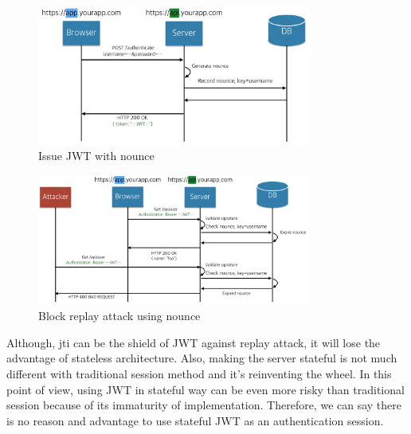 \documentclass[journal,article,submit,moreauthors,pdftex,10pt,a4paper]{mdpi}
\begin{document}
\begin{figure}[H]
\centering
\includegraphics[width=9cm]{figures/nounce_issue}
\caption{Issue JWT with nounce}
\label{nounce_issue}
\end{figure}

\begin{figure}[H]
\centering
\includegraphics[width=9cm]{figures/nounce_use}
\caption{Block replay attack using nounce}
\label{nounce_use}
\end{figure}

Although, jti can be the shield of JWT against replay attack, it will lose the advantage of stateless architecture. Also, making the server stateful is not much different with traditional session method and it's reinventing the wheel. In this point of view, using JWT in stateful way can be even more risky than traditional session because of its immaturity of implementation.
Therefore, we can say there is no reason and advantage to use stateful JWT as an authentication session.



\end{document}
